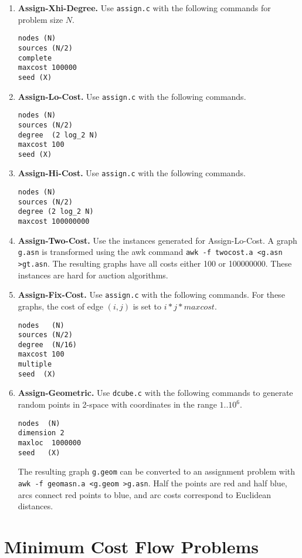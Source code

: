 \begin{enumerate} 
\item {\bf Assign-Xhi-Degree.}  Use {\tt assign.c} with the following
commands for problem size $N$. 
\begin{verbatim}
nodes (N)
sources (N/2)
complete
maxcost 100000
seed (X)
\end{verbatim}

\item {\bf Assign-Lo-Cost.}  Use {\tt assign.c} with the following
commands.
\begin{verbatim}
nodes (N)
sources (N/2)
degree  (2 log_2 N)
maxcost 100
seed (X)
\end{verbatim}

\item {\bf Assign-Hi-Cost.}  Use {\tt assign.c} with the following
commands.
\begin{verbatim}
nodes (N)
sources (N/2)
degree (2 log_2 N)
maxcost 100000000
\end{verbatim} 

\item {\bf Assign-Two-Cost.}  Use the instances generated for 
Assign-Lo-Cost.  A graph {\tt g.asn} is transformed using the
awk command {\tt awk -f twocost.a <g.asn >gt.asn}.  The resulting graphs
have all costs either 100 or 100000000.  These instances are hard
for auction algorithms. 

\item {\bf Assign-Fix-Cost.}  Use {\tt assign.c} with the following
commands.  For these graphs, the cost of edge $(i,j)$ is set to 
$i*j*maxcost$.
\begin{verbatim}
nodes   (N)
sources (N/2)
degree  (N/16)
maxcost 100
multiple 
seed  (X) 
\end{verbatim}

\item {\bf Assign-Geometric.}  Use {\tt dcube.c} with the following
commands to generate random points in 2-space with coordinates in the
range $1..10^6$. 
\begin{verbatim} 
nodes  (N)
dimension 2
maxloc  1000000
seed   (X) 
\end{verbatim} 
The resulting graph {\tt g.geom} can be converted to an assignment
problem with {\tt awk -f geomasn.a <g.geom >g.asn}.  Half the points
are red and half blue, arcs connect red points to blue, and arc costs
correspond to Euclidean distances. 
\end{enumerate}

\section{Minimum Cost Flow Problems}

